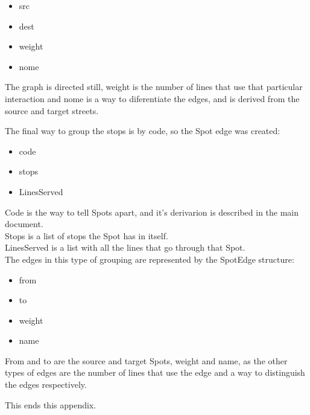 \documentclass[12pt]{article}
\begin{document}
	\begin{itemize}
	\item src
	\item dest
	\item weight
	\item nome
	\end{itemize}
	
	The graph is directed still, weight is the number of lines that use that particular interaction and nome is a way to diferentiate the edges, and is derived from the source and target streets.
	
	The final way to group the stops is by code, so the Spot edge was created:
	
	\begin{itemize}
	\item code
	\item stops
	\item LinesServed
	\end{itemize}
	
Code is the way to tell Spots apart, and it's derivarion is described in the main document.\\
Stops is a list of stops the Spot has in itself.\\
LinesServed is a list with all the lines that go through that Spot.\\

The edges in this type of grouping are represented by the SpotEdge structure:
\begin{itemize}
\item from
\item to
\item weight
\item name
\end{itemize}

From and to are the source and target Spots, weight and name, as the other types of edges are the number of lines that use the edge and a way to distinguish the edges respectively.

This ends this appendix.
\end{document}
